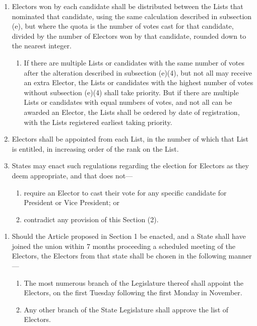 \documentclass{article}
\begin{document}
\begin{enumerate}
\begin{enumerate}
        \end{enumerate}
        \item Electors won by each candidate shall be distributed between the Lists that nominated that candidate, using the same calculation described in subsection (e), but where the quota is the number of votes cast for that candidate, divided by the number of Electors won by that candidate, rounded down to the nearest integer.
        \begin{enumerate}
            \item If there are multiple Lists or candidates with the same number of votes after the alteration described in subsection (e)(4), but not all may receive an extra Elector, the Lists or candidates with the highest number of votes without subsection (e)(4) shall take priority. But if there are multiple Lists or candidates with equal numbers of votes, and not all can be awarded an Elector, the Lists shall be ordered by date of registration, with the Lists registered earliest taking priority. 
        \end{enumerate}
        \item Electors shall be appointed from each List, in the number of which that List is entitled, in increasing order of the rank on the List. 
        \item States may enact such regulations regarding the election for Electors as they deem appropriate, and that does not---
        \begin{enumerate}
            \item require an Elector to cast their vote for any specific candidate for President or Vice President; or
            \item contradict any provision of this Section (2).
        \end{enumerate}    
    \end{enumerate}
    \begin{enumerate}   
        \item Should the Article proposed in Section 1 be enacted, and a State shall have joined the union within 7 months proceeding a scheduled meeting of the Electors, the Electors from that state shall be chosen in the following manner---
        \begin{enumerate}
            \item The most numerous branch of the Legislature thereof shall appoint the Electors, on the first Tuesday following the first Monday in November.
            \item Any other branch of the State Legislature shall approve the list of Electors.
        \end{enumerate}
    \end{enumerate}
\end{document}
